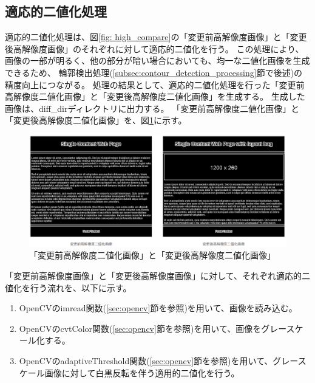 \subsection{適応的二値化処理}\label{subsec:Adaptive_Binarisation}
適応的二値化処理は、図\ref{fig: high_compare}の「変更前高解像度画像」と「変更後高解像度画像」のそれぞれに対して適応的二値化を行う。
この処理により、画像の一部が明るく、他の部分が暗い場合においても、均一な二値化画像を生成できるため、
輪郭検出処理(\ref{subsec:contour_detection_processing}節で後述)の精度向上につながる。
処理の結果として、適応的二値化処理を行った「変更前高解像度二値化画像」と「変更後高解像度二値化画像」を生成する。
生成した画像は、diff\_dirディレクトリに出力する。
「変更前高解像度二値化画像」と「変更後高解像度二値化画像」を、図\ref{fig: img_high_bin_bf_af}に示す。
\begin{figure}[tp]
    \begin{center}
        \includegraphics[width=1.0\columnwidth]{image/4_img_high_bin_bf_af.png}
        \caption{「変更前高解像度二値化画像」と「変更後高解像度二値化画像」}
        \label{fig: img_high_bin_bf_af}
    \end{center}
\end{figure}
\par
「変更前高解像度画像」と「変更後高解像度画像」に対して、それぞれ適応的二値化を行う流れを、以下に示す。
\begin{enumerate}
    \item OpenCVのimread関数(\ref{sec:opencv}節を参照)を用いて、画像を読み込む。
    \item OpenCVのcvtColor関数(\ref{sec:opencv}節を参照)を用いて、画像をグレースケール化する。
    \item OpenCVのadaptiveThreshold関数(\ref{sec:opencv}節を参照)を用いて、グレースケール画像に対して白黒反転を伴う適用的二値化を行う。
\end{enumerate}

